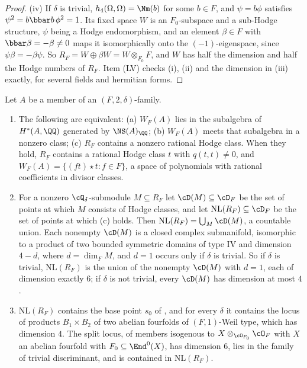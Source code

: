 \begin{proof}
(iv) If $\delta$ is trivial, $h_{4}(\Omega,\Omega)=\Nm(b)$ for some $b\in F$,
and $\psi=b\phi$ satisfies $\psi^{2}=b\bbar b\,\phi^{2}=1$. Its fixed space
$W$ is an $F_{0}$-subspace and a sub-Hodge structure, $\psi$ being a Hodge
endomorphism, and an element $\beta\in F$ with $\bbar\beta=-\beta\ne0$ maps it
isomorphically onto the $(-1)$-eigenspace, since $\psi\beta=-\beta\psi$. So
$R_{F}=W\oplus\beta W=W\otimes_{F_{0}}F$, and $W$ has half the dimension and
half the Hodge numbers of $R_{F}$. Item (LV) checks (i), (ii) and the
dimension in (iii) exactly, for several fields and hermitian forms.
\end{proof}

\begin{proposition}\label{prop:quarticnl}
Let $A$ be a member of an $(F,2,\delta)$-family.
\begin{enumerate}[label=\textup{(\roman*)},leftmargin=2.6em,itemsep=2pt]
\item The following are equivalent: \textup{(a)} $W_{F}(A)$ lies in the
  subalgebra of $H^{*}(A,\QQ)$ generated by $\NS(A)_{\QQ}$; \textup{(b)}
  $W_{F}(A)$ meets that subalgebra in a nonzero class; \textup{(c)} $R_{F}$
  contains a nonzero rational Hodge class. When they hold, $R_{F}$ contains a
  rational Hodge class $t$ with $q(t,t)\ne0$, and
  $W_{F}(A)=\{(ft)\star t:f\in F\}$, a space of polynomials with rational
  coefficients in divisor classes.
\item For a nonzero $\cQ_{\delta}$-submodule $M\subseteq R_{F}$ let
  $\cD(M)\subseteq\cD_{F}$ be the set of points at which $M$ consists of Hodge
  classes, and let $\mathrm{NL}(R_{F})\subseteq\cD_{F}$ be the set of points at
  which \textup{(c)} holds. Then $\mathrm{NL}(R_{F})=\bigcup_{M}\cD(M)$, a
  countable union. Each nonempty $\cD(M)$ is a closed complex submanifold,
  isomorphic to a product of two bounded symmetric domains of type IV and
  dimension $4-d$, where $d=\dim_{F}M$, and $d=1$ occurs only if $\delta$ is
  trivial. So if $\delta$ is trivial, $\mathrm{NL}(R_{F})$ is the union of the
  nonempty $\cD(M)$ with $d=1$, each of dimension exactly $6$; if $\delta$ is
  not trivial, every $\cD(M)$ has dimension at most $4$.
\item $\mathrm{NL}(R_{F})$ contains the base point $s_{0}$ of
  , and for every $\delta$ it contains the locus of
  products $B_{1}\times B_{2}$ of two abelian fourfolds of $(F,1)$-Weil type,
  which has dimension $4$. The split locus, of members isogenous to
  $X\otimes_{\cO_{F_{0}}}\cO_{F}$ with $X$ an abelian fourfold with
  $F_{0}\subseteq\End^{0}(X)$, has dimension $6$, lies in the family of
  trivial discriminant, and is contained in $\mathrm{NL}(R_{F})$.
\end{enumerate}
\end{proposition}

